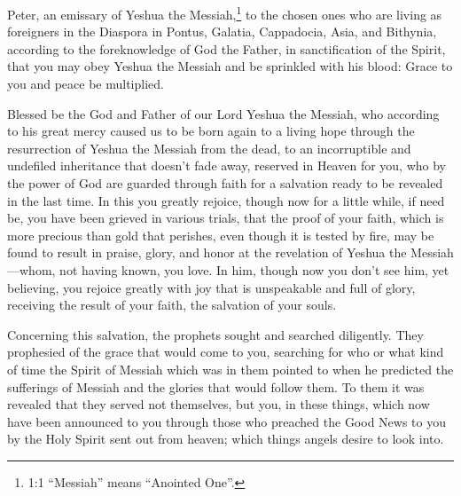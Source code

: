 \newpage
\null
\thispagestyle{empty}
\newpage






\vspace{-1.36in}


\mychapter{} \myverse*{}Peter, an emissary of Yeshua the Messiah,\footnote{1:1 “Messiah” means “Anointed One”.} to the chosen ones who are living as foreigners in the Diaspora in Pontus, Galatia, Cappadocia, Asia, and Bithynia, \myverse{}according to the foreknowledge of God the Father, in sanctification of the Spirit, that you may obey Yeshua the Messiah and be sprinkled with his blood: Grace to you and peace be multiplied.


\myverse{}Blessed be the God and Father of our Lord Yeshua the Messiah, who according to his great mercy caused us to be born again to a living hope through the resurrection of Yeshua the Messiah from the dead, \myverse{}to an incorruptible and undefiled inheritance that doesn’t fade away, reserved in Heaven for you, \myverse{}who by the power of God are guarded through faith for a salvation ready to be revealed in the last time. \myverse{}In this you greatly rejoice, though now for a little while, if need be, you have been grieved in various trials, \myverse{}that the proof of your faith, which is more precious than gold that perishes, even though it is tested by fire, may be found to result in praise, glory, and honor at the revelation of Yeshua the Messiah—\myverse{}whom, not having known, you love. In him, though now you don’t see him, yet believing, you rejoice greatly with joy that is unspeakable and full of glory, \myverse{}receiving the result of your faith, the salvation of your souls.


\myverse{}Concerning this salvation, the prophets sought and searched diligently. They prophesied of the grace that would come to you, \myverse{}searching for who or what kind of time the Spirit of Messiah which was in them pointed to when he predicted the sufferings of Messiah and the glories that would follow them. \myverse{}To them it was revealed that they served not themselves, but you, in these things, which now have been announced to you through those who preached the Good News to you by the Holy Spirit sent out from heaven; which things angels desire to look into.


